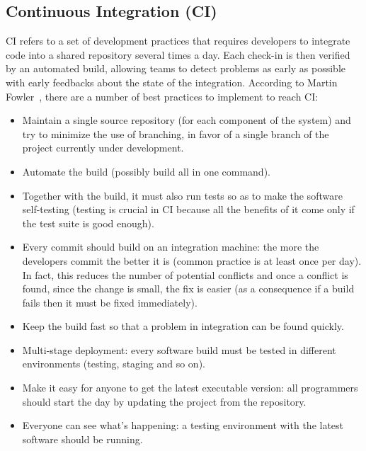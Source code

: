 \documentclass[a4paper]{spie}  %
\begin{document}
\subsection{Continuous Integration (CI)}
CI refers to a set of development practices that requires developers to integrate code into a shared repository several times a day. Each check-in is then verified by an automated build, allowing teams to detect problems as early as possible with early feedbacks about the state of the integration.
According to Martin Fowler~\cite{CI}, there are a number of best practices to implement to reach CI:
\begin{itemize}
    \item Maintain a single source repository (for each component of the system) and try to minimize the use of branching, in favor of a single branch of the project currently under development.
    \item Automate the build (possibly build all in one command).
    \item Together with the build, it must also run tests so as to make the software self-testing (testing is crucial in CI because all the benefits of it come only if the test suite is good enough).
    \item Every commit should build on an integration machine: the more the developers commit the better it is (common practice is at least once per day). In fact, this reduces the number of potential conflicts and once a conflict is found, since the change is small, the fix is easier (as a consequence if a build fails then it must be fixed immediately).
    \item Keep the build fast so that a problem in integration can be found quickly.
    \item Multi-stage deployment: every software build must be tested in different environments (testing, staging and so on).
    \item Make it easy for anyone to get the latest executable version: all programmers should start the day by updating the project from the repository.
    \item Everyone can see what’s happening: a testing environment with the latest software should be running.
\end{itemize}
\end{document}
